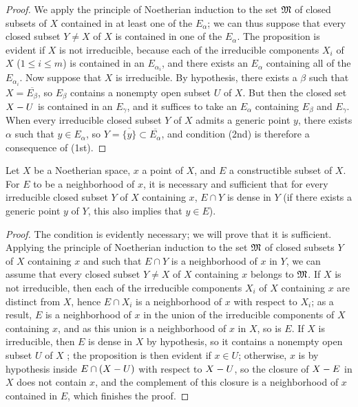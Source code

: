 \begin{proof}
\label{proof-0.9.2.4}
We apply the principle of Noetherian induction  to the set $\mathfrak{M}$ of closed subsets of $X$ contained in at least one of the $E_\alpha$; we can thus suppose that every closed subset $Y\neq X$ of $X$ is contained in one of the $E_\alpha$.
The proposition is evident if $X$ is not irreducible, because each of the irreducible components $X_i$ of $X$ ($1\leqslant i\leqslant m$) is contained in an $E_{\alpha_i}$, and there exists an $E_\alpha$ containing all of the $E_{\alpha_i}$.
Now suppose that $X$ is irreducible.
By hypothesis, there exists a $\beta$ such that $X=\overline{E_\beta}$, so  $E_\beta$ contains a nonempty open subset $U$ of $X$.
But then the closed set $X- U$ is contained in an $E_\gamma$, and it suffices to take an $E_\alpha$ containing $E_\beta$ and $E_\gamma$.
When every irreducible closed subset $Y$ of $X$
admits a generic point $y$, there exists $\alpha$ such that $y\in E_\alpha$, so $Y=\overline{\{y\}}\subset\overline{E_\alpha}$, and condition (2nd) is therefore a consequence of (1st).
\end{proof}

\begin{prop}[9.2.5]
\label{0.9.2.5}
Let $X$ be a Noetherian space, $x$ a point of $X$, and $E$ a constructible subset of $X$.
For $E$ to be a neighborhood of $x$, it is necessary and sufficient that for every irreducible closed subset $Y$ of $X$ containing $x$, $E\cap Y$ is dense in $Y$ (if there exists a generic point $y$ of $Y$, this also implies  that $y\in E$).
\end{prop}

\begin{proof}
\label{proof-0.9.2.5}
The condition is evidently necessary; we will prove that it is sufficient.
Applying the principle of Noetherian induction to the set $\mathfrak{M}$ of closed subsets $Y$ of $X$ containing $x$ and such that $E\cap Y$ is a neighborhood of $x$ in $Y$, we can assume that every closed subset $Y\neq X$ of $X$ containing $x$ belongs to $\mathfrak{M}$.
If $X$ is not irreducible, then each of the irreducible components $X_i$ of $X$ containing $x$ are distinct from $X$, hence $E\cap X_i$ is a neighborhood of $x$ with respect to $X_i$; as a result, $E$ is a neighborhood of $x$ in the union of the irreducible components of $X$ containing $x$, and as this union is a neighborhood of $x$ in $X$, so is $E$.
If $X$ is irreducible, then $E$ is dense in $X$ by hypothesis, so it contains a nonempty open subset $U$ of $X$ ; the proposition is then evident if $x\in U$; otherwise, $x$ is by hypothesis inside $E\cap(X- U)$ with respect to $X- U$, so the closure of $X- E$ in $X$ does not contain $x$, and the complement of this closure is a neighborhood of $x$ contained in $E$, which finishes the proof.
\end{proof}

